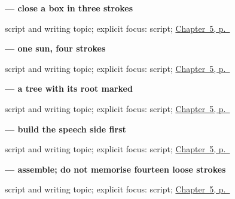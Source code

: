 \noindent\begin{minipage}[t]{\linewidth}
\raggedright
\textbf{ — close a box in three strokes}\par
\footnotesize script and writing topic; explicit focus: script; \hyperref[ch:ja-nihongo-kanji]{Chapter~5, p.~\pageref*{ch:ja-nihongo-kanji}}
\end{minipage}\par\smallskip

\noindent\begin{minipage}[t]{\linewidth}
\raggedright
\textbf{ — one sun, four strokes}\par
\footnotesize script and writing topic; explicit focus: script; \hyperref[ch:ja-nihongo-kanji]{Chapter~5, p.~\pageref*{ch:ja-nihongo-kanji}}
\end{minipage}\par\smallskip

\noindent\begin{minipage}[t]{\linewidth}
\raggedright
\textbf{ — a tree with its root marked}\par
\footnotesize script and writing topic; explicit focus: script; \hyperref[ch:ja-nihongo-kanji]{Chapter~5, p.~\pageref*{ch:ja-nihongo-kanji}}
\end{minipage}\par\smallskip

\noindent\begin{minipage}[t]{\linewidth}
\raggedright
\textbf{ — build the speech side first}\par
\footnotesize script and writing topic; explicit focus: script; \hyperref[ch:ja-nihongo-kanji]{Chapter~5, p.~\pageref*{ch:ja-nihongo-kanji}}
\end{minipage}\par\smallskip

\noindent\begin{minipage}[t]{\linewidth}
\raggedright
\textbf{ — assemble; do not memorise fourteen loose strokes}\par
\footnotesize script and writing topic; explicit focus: script; \hyperref[ch:ja-nihongo-kanji]{Chapter~5, p.~\pageref*{ch:ja-nihongo-kanji}}
\end{minipage}\par\smallskip
